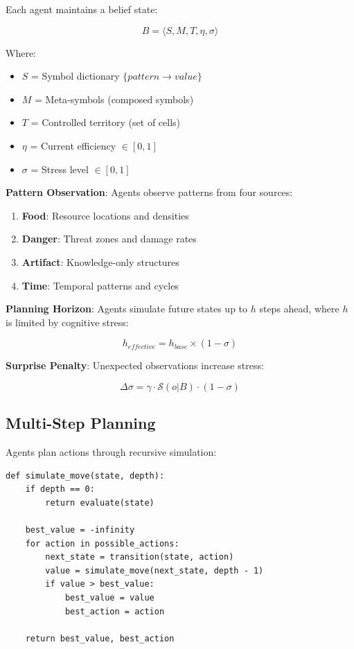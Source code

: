 \documentclass[11pt,a4paper]{article}
\begin{document}
Each agent maintains a belief state:

\begin{equation}
B = \langle S, M, T, \eta, \sigma \rangle
\end{equation}

Where:
\begin{itemize}
    \item $S$ = Symbol dictionary $\{pattern \rightarrow value\}$
    \item $M$ = Meta-symbols (composed symbols)
    \item $T$ = Controlled territory (set of cells)
    \item $\eta$ = Current efficiency $\in [0, 1]$
    \item $\sigma$ = Stress level $\in [0, 1]$
\end{itemize}

\textbf{Pattern Observation}: Agents observe patterns from four sources:
\begin{enumerate}
    \item \textbf{Food}: Resource locations and densities
    \item \textbf{Danger}: Threat zones and damage rates
    \item \textbf{Artifact}: Knowledge-only structures
    \item \textbf{Time}: Temporal patterns and cycles
\end{enumerate}

\textbf{Planning Horizon}: Agents simulate future states up to $h$ steps ahead, where $h$ is limited by cognitive stress:

\begin{equation}
h_{effective} = h_{base} \times (1 - \sigma)
\end{equation}

\textbf{Surprise Penalty}: Unexpected observations increase stress:

\begin{equation}
\Delta\sigma = \gamma \cdot \mathcal{S}(o | B) \cdot (1 - \sigma)
\end{equation}

\subsection{Multi-Step Planning}

Agents plan actions through recursive simulation:

\begin{verbatim}
def simulate_move(state, depth):
    if depth == 0:
        return evaluate(state)
    
    best_value = -infinity
    for action in possible_actions:
        next_state = transition(state, action)
        value = simulate_move(next_state, depth - 1)
        if value > best_value:
            best_value = value
            best_action = action
    
    return best_value, best_action
\end{verbatim}
\end{document}
